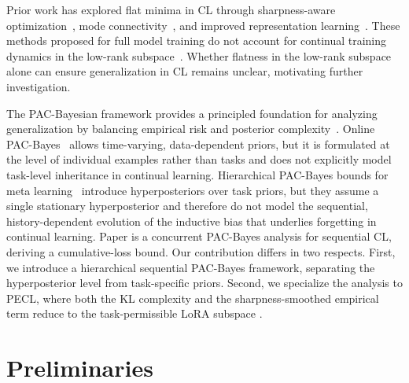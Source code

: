 \documentclass[10pt]{article} %
\newcommand{\minisection}[1]{\vspace{0.04in}\noindent{\bf #1}}
\begin{document}
\minisection{Flat Minima.}
Prior work has explored flat minima in CL through sharpness-aware optimization~\cite{pmlr-v151-bisla22a,Zhang_GAM,NEURIPS2024_C-Flat,yangRevisitingFlatnessAwareOptimization2025,chen2026sharpnessflatnessdecompositionframework}, mode connectivity~\cite{izmailov2019averagingweightsleadswider,mirzadeh2020linearmodeconnectivitymultitask}, and improved representation learning~\cite{hu2022doesselfsupervisedpretrainingperform,ramasesh2022effect}.
These methods proposed for full model training do not account for continual training dynamics in the low-rank subspace~\cite{yangRevisitingFlatnessAwareOptimization2025}. Whether flatness in the low-rank subspace alone can ensure generalization in CL remains unclear, motivating further investigation.


\minisection{PAC-Bayesian Theory.}
The PAC-Bayesian framework provides a principled foundation for analyzing generalization by balancing empirical risk and posterior complexity~\cite{mcallesterPACBayesianModelAveraging1999,mcallesterPACBayesianStochasticModel2003,pentinaPACBayesianBoundLifelong2014,germainPACBayesianTheoryMeets2016,lotfiPACBayesCompressionBounds2022}.
Online PAC-Bayes~\citep{NEURIPS2022_onlineBayes,NEURIPS2024_xinrui} allows time-varying, data-dependent priors, but it is formulated at the level of individual examples rather than tasks and does not explicitly model task-level inheritance in continual learning.
Hierarchical PAC-Bayes bounds for meta learning~\citep{pentinaPACBayesianBoundLifelong2014,JMLR:v24:22-1254} introduce hyperposteriors over task priors, but they assume a single stationary hyperposterior and therefore do not model the sequential, history-dependent evolution of the inductive bias that underlies forgetting in continual learning. Paper \cite{friedman2026pac} is a concurrent PAC-Bayes analysis for sequential CL, deriving a cumulative-loss bound. Our contribution differs in two respects. First, we introduce a hierarchical sequential PAC-Bayes framework, separating the hyperposterior level from task-specific priors. Second, we specialize the analysis to PECL, where both the KL complexity and the sharpness-smoothed empirical term reduce to the task-permissible LoRA subspace .


\section{Preliminaries}
\end{document}
